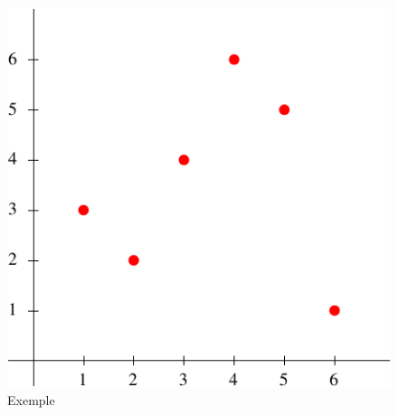 \begin{figure}
 \centering
 \includegraphics{Cmonextr_1.pdf}
 \caption{Exemple}
 \label{fig:Cmonextr_1}
\end{figure}


